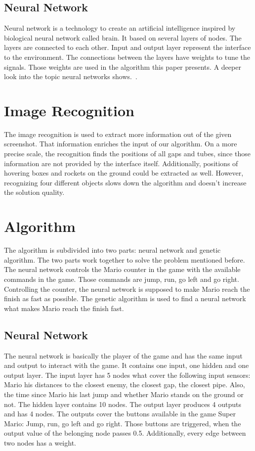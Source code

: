 \documentclass[a4paper]{article}
\begin{document}
\subsection{Neural Network}
Neural network is a technology to create an artificial intelligence inspired by biological neural network called brain. It based on several layers of nodes. The layers are connected to each other. Input and output layer represent the interface to the environment. The connections between the layers have weights to tune the signals. Those weights are used in the algorithm this paper presents. A deeper look into the topic neural networks shows.~\cite{Whitley93agenetic}.


\section{Image Recognition}
The image recognition is used to extract more information out of the given screenshot. That information enriches the input of our algorithm. On a more precise scale, the recognition finds the positions of all gaps and tubes, since those information are not provided by the interface itself. Additionally, positions of hovering boxes and rockets on the ground could be extracted as well. However, recognizing four different objects slows down the algorithm and doesn’t increase the solution quality.

\section{Algorithm}
The algorithm is subdivided into two parts: neural network and genetic algorithm.
The two parts work together to solve the problem mentioned before. The neural network controls the Mario counter in the game with the available commands in the game. Those commands are jump, run, go left and go right. Controlling the counter, the neural network is supposed to make Mario reach the finish as fast as possible.
The genetic algorithm is used to find a neural network what makes Mario reach the finish fast.


\subsection{Neural Network}
\label{subsec:neural}
The neural network is basically the player of the game and has the same input and output to interact with the game. It contains one input, one hidden and one output layer.
The input layer has 5 nodes what cover the following input sensors: Mario his distances to the closest enemy, the closest gap, the closest pipe. Also, the time since Mario his last jump and whether Mario stands on the ground or not. The hidden layer contains 10 nodes. The output layer produces 4 outputs and has 4 nodes. The outputs cover the buttons available in the game Super Mario:  Jump, run, go left and go right. Those buttons are triggered, when the output value of the belonging node passes 0.5. Additionally, every edge between two nodes has a weight.
\end{document}
